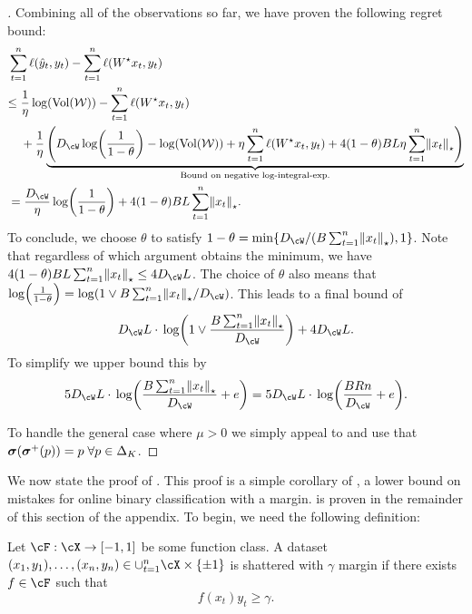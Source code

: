 \begin{proof}[]
Combining all of the observations so far, we have proven the following regret bound:
\begin{align*}
&\sum_{t=1}^{n}\ls(\yh_t,y_t) - \sum_{t=1}^{n}\ls(W^{\star}x_t,y_t) \\ &
\begin{aligned}
\leq{}& \frac{1}{\eta}\log(\vol(\mathcal{W})) - \sum_{t=1}^{n}\ls(W^{\star}x_t,y_t) \\ &+ \frac{1}{\eta}\underbrace{\prn*{
D_{\cW}\log\prn*{\frac{1}{1-\theta}} - \log(\vol(\mathcal{W}))
+ \eta\sum_{t=1}^{n}\ls(W^{\star}x_t,y_t)
+ 4(1-\theta)BL\eta\sum_{t=1}^{n}\nrm*{x_t}_{\star}
}}_{\text{Bound on negative log-integral-exp.}}
\end{aligned}
\\
&= \frac{D_{\cW}}{\eta}\log\prn*{\frac{1}{1-\theta}} + 4(1-\theta)BL\sum_{t=1}^{n}\nrm*{x_t}_{\star}.
\end{align*}
To conclude, we choose $\theta$ to satisfy $1-\theta=\min\crl*{D_{\cW}/(B\sum_{t=1}^{n}\nrm*{x_t}_{\star}), 1}$. Note that regardless of which argument obtains the minimum, we have $4(1-\theta)BL\sum_{t=1}^{n}\nrm*{x_t}_{\star} \leq{} 4D_{\cW}L$. The choice of $\theta$ also means that $\log\prn*{\frac{1}{1-\theta}} = \log\prn*{1\vee{}B\sum_{t=1}^{n}\nrm*{x_t}_{\star}/D_{\cW}}$. This leads to a final bound of
\[
D_{\cW}L\cdot{}\log\prn*{1\vee{}\frac{B\sum_{t=1}^{n}\nrm*{x_t}_{\star}}{D_{\cW}}} + 4D_{\cW}L.
\]
To simplify we upper bound this by
\[
5D_{\cW}L\cdot{}\log\prn*{\frac{B\sum_{t=1}^{n}\nrm*{x_t}_{\star}}{D_{\cW}} + e} = 5D_{\cW}L\cdot{}\log\prn*{\frac{BRn}{D_{\cW}} + e}.
\]

To handle the general case where $\mu>0$ we simply appeal to  and use that $\boldsymbol{\sigma}(\boldsymbol{\sigma}^{+}(p)) = p\;\forall{}p\in\Delta_{K}$.

\end{proof}

We now state the proof of . This proof is a simple corollary of , a lower bound on mistakes for online binary classification with a margin.  is proven in the remainder of this section of the appendix. To begin, we need the following definition:
\begin{definition}
Let $\cF:\cX\to\brk{-1,1}$ be some function class. A dataset $(x_1,y_1),\ldots,(x_n,y_n)\in \cup_{t=1}^{n}\cX\times{}\pmo$ is shattered with $\gamma$ margin if there exists $f\in\cF$ such that
\[
f(x_t)y_t\geq{}\gamma.
\]
\end{definition}



